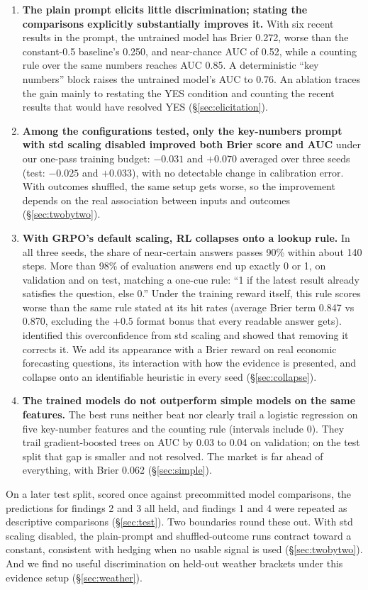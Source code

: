 \documentclass[11pt]{article}
\begin{document}
\begin{enumerate}[leftmargin=*]
\item \textbf{The plain prompt elicits little discrimination; stating the comparisons explicitly substantially improves it.} With six recent results in the prompt, the untrained model has Brier 0.272, worse than the constant-0.5 baseline's 0.250, and near-chance AUC of 0.52, while a counting rule over the same numbers reaches AUC 0.85. A deterministic ``key numbers'' block raises the untrained model's AUC to 0.76. An ablation traces the gain mainly to restating the YES condition and counting the recent results that would have resolved YES (\S\ref{sec:elicitation}).
\item \textbf{Among the configurations tested, only the key-numbers prompt with std scaling disabled improved both Brier score and AUC} under our one-pass training budget: $-0.031$ and $+0.070$ averaged over three seeds (test: $-0.025$ and $+0.033$), with no detectable change in calibration error. With outcomes shuffled, the same setup gets worse, so the improvement depends on the real association between inputs and outcomes (\S\ref{sec:twobytwo}).
\item \textbf{With GRPO's default scaling, RL collapses onto a lookup rule.} In all three seeds, the share of near-certain answers passes 90\% within about 140 steps. More than 98\% of evaluation answers end up exactly 0 or 1, on validation and on test, matching a one-cue rule: ``1 if the latest result already satisfies the question, else 0.'' Under the training reward itself, this rule scores worse than the same rule stated at its hit rates (average Brier term 0.847 vs 0.870, excluding the $+0.5$ format bonus that every readable answer gets). \citet{bereket2025uncalibrated} identified this overconfidence from std scaling and showed that removing it corrects it. We add its appearance with a Brier reward on real economic forecasting questions, its interaction with how the evidence is presented, and collapse onto an identifiable heuristic in every seed (\S\ref{sec:collapse}).
\item \textbf{The trained models do not outperform simple models on the same features.} The best runs neither beat nor clearly trail a logistic regression on five key-number features and the counting rule (intervals include 0). They trail gradient-boosted trees on AUC by 0.03 to 0.04 on validation; on the test split that gap is smaller and not resolved. The market is far ahead of everything, with Brier 0.062 (\S\ref{sec:simple}).
\end{enumerate}
On a later test split, scored once against precommitted model comparisons, the predictions for findings 2 and 3 all held, and findings 1 and 4 were repeated as descriptive comparisons (\S\ref{sec:test}). Two boundaries round these out. With std scaling disabled, the plain-prompt and shuffled-outcome runs contract toward a constant, consistent with hedging when no usable signal is used (\S\ref{sec:twobytwo}). And we find no useful discrimination on held-out weather brackets under this evidence setup (\S\ref{sec:weather}).
\end{document}
